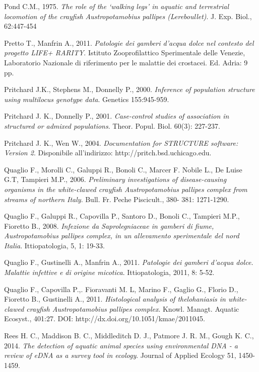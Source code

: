 \documentclass[11pt,a4paper,italian,twoside,openany]{memoir}
\begin{document}
\begin{thebibliography}{9}
 Pond C.M., 1975. \emph{The role of the ‘walking legs' in aquatic and terrestrial locomotion of the crayfish Austropotamobius pallipes (Lereboullet)}. J. Exp. Biol., 62:447-454

 Pretto T., Manfrin A., 2011. \emph{Patologie dei gamberi d'acqua dolce nel contesto del progetto LIFE+ RARITY}. Istituto Zooprofilattico Sperimentale delle Venezie, Laboratorio Nazionale di riferimento per le malattie dei crostacei. Ed. Adria: 9 pp.

 Pritchard J.K., Stephens M., Donnelly P., 2000. \emph{Inference of population structure using multilocus genotype data}. Genetics 155:945-959. 

 Pritchard J. K., Donnelly P., 2001. \emph{Case-control studies of association in structured or admixed populations}. Theor. Popul. Biol. 60(3): 227-237.

 Pritchard J. K., Wen W., 2004. \emph{Documentation for STRUCTURE software: Version 2}. Disponibile all'indirizzo: http://pritch.bsd.uchicago.edu.    

 Quaglio F., Morolli C., Galuppi R., Bonoli C., Marcer F. Nobile L., De Luise G.T, Tampieri M.P., 2006. \emph{Preliminary investigations of disease-causing organisms in the white-clawed crayfish Austropotamobius pallipes complex from streams of northern Italy}. Bull. Fr. Peche Piscicult., 380- 381: 1271-1290.

 Quaglio F., Galuppi R., Capovilla P., Santoro D., Bonoli C., Tampieri M.P., Fioretto B., 2008. \emph{Infezione da Saprolegniaceae in gamberi di fiume, Austropotamobius pallipes complex, in un allevamento sperimentale del nord Italia}. Ittiopatologia, 5, 1: 19-33.

 Quaglio F., Gustinelli A., Manfrin A., 2011. \emph{Patologie dei gamberi d'acqua dolce. Malattie infettive e di origine micotica}. Ittiopatologia, 2011, 8: 5-52.

 Quaglio F., Capovilla P.,. Fioravanti M. L, Marino F., Gaglio G., Florio D., Fioretto B., Gustinelli A., 2011. \emph{Histological analysis of thelohaniasis in white-clawed crayfish Austropotamobius pallipes complex}. Knowl. Managt. Aquatic Ecosyst., 401:27. DOI: http://dx.doi.org/10.1051/kmae/2011045.

 Rees H. C., Maddison B. C., Middleditch D. J., Patmore J. R. M., Gough K. C., 2014. \emph{The detection of aquatic animal species using environmental DNA - a review of eDNA as a survey tool in ecology}. Journal of Applied Ecology 51, 1450-1459.


\end{thebibliography}
\end{document}
